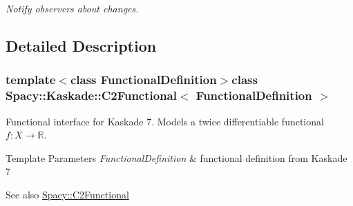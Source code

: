 \begin{DoxyCompactItemize}
\begin{DoxyCompactList}\small\item\em \-Notify observers about changes. \end{DoxyCompactList}\end{DoxyCompactItemize}


\subsection{\-Detailed \-Description}
\subsubsection*{template$<$class \-Functional\-Definition$>$class Spacy\-::\-Kaskade\-::\-C2\-Functional$<$ Functional\-Definition $>$}

\-Functional interface for \-Kaskade 7. \-Models a twice differentiable functional $f:X\rightarrow \mathbb{R}$. 


\begin{DoxyTemplParams}{\-Template Parameters}
{\em \-Functional\-Definition} & functional definition from \-Kaskade 7 \\
\hline
\end{DoxyTemplParams}
\begin{DoxySeeAlso}{\-See also}
\hyperlink{classSpacy_1_1C2Functional}{\-Spacy\-::\-C2\-Functional} 
\end{DoxySeeAlso}


